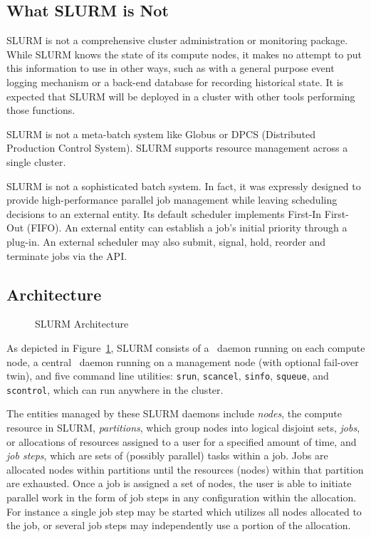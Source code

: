 \subsection{What SLURM is Not}

SLURM is not a comprehensive cluster administration or monitoring package.  
While SLURM knows the state of its compute nodes, it makes no attempt to put
this information to use in other ways, such as with a general purpose event
logging mechanism or a back-end database for recording historical state.
It is expected that SLURM will be deployed in a cluster with other 
tools performing those functions. 

SLURM is not a meta-batch system like Globus\cite{Globus2002}
or DPCS (Distributed Production Control System)\cite{DPCS2002}.  
SLURM supports resource management across a single cluster.

SLURM is not a sophisticated batch system.  
In fact, it was expressly designed to provide high-performance 
parallel job management while leaving scheduling decisions to an 
external entity. 
Its default scheduler implements First-In First-Out (FIFO). 
An external entity can establish a job's initial priority 
through a plug-in.
An external scheduler may also submit, signal, hold, reorder and 
terminate jobs via the API.


\subsection{Architecture}

\begin{figure}[tb]
\centerline{}
\caption{SLURM Architecture}
\label{arch}
\end{figure}

As depicted in Figure~\ref{arch}, SLURM consists of a \slurmd\ daemon
running on each compute node, a central \slurmctld\ daemon running on
a management node (with optional fail-over twin), and five command line
utilities: {\tt srun}, {\tt scancel}, {\tt sinfo}, {\tt squeue}, and 
{\tt scontrol}, which can run anywhere in the cluster.  

The entities managed by these SLURM daemons include {\em nodes}, the
compute resource in SLURM, {\em partitions}, which group nodes into
logical disjoint sets, {\em jobs}, or allocations of resources assigned
to a user for a specified amount of time, and {\em job steps}, which are
sets of (possibly parallel) tasks within a job.  
Jobs are allocated nodes within 
partitions until the resources (nodes) within that partition are exhausted. 
Once a job is assigned a set of nodes, the user is able to initiate
parallel work in the form of job steps in any configuration within the
allocation. For instance a single job step may be started which utilizes
all nodes allocated to the job, or several job steps may independently 
use a portion of the allocation.

